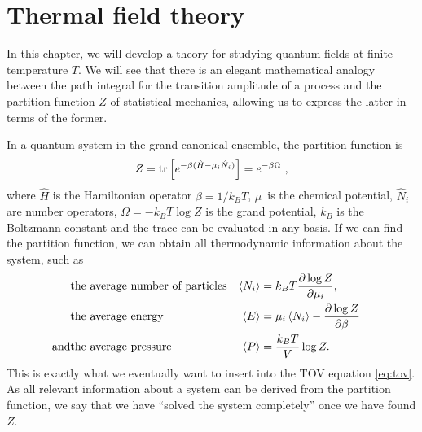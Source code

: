 \chapter{Thermal field theory}

\newcommand{\transampl}{\Braket{\phi_B | e^{- i \hat{H} T / \hbar} | \phi_A}}

In this chapter, we will develop a theory for studying quantum fields at finite temperature $T$.
We will see that there is an elegant mathematical analogy between the path integral for the transition amplitude of a process and the partition function $Z$ of statistical mechanics, allowing us to express the latter in terms of the former.

In a quantum system in the grand canonical ensemble, the partition function is 
\begin{equation}
	Z = \trace \left[ e^{-\beta (\hat{H} - \mu_i \hat{N}_i)} \right] = e^{-\beta \Omega} ,
\label{eq:tft:partition_function}
\end{equation}
where $\hat{H}$ is the Hamiltonian operator $\beta = 1 / k_B T$, $\mu$ is the chemical potential, $\hat{N}_i$ are number operators, $\Omega = -k_B T \log{Z}$ is the grand potential, $k_B$ is the Boltzmann constant and the trace can be evaluated in any basis.
If we can find the partition function, we can obtain all thermodynamic information about the system, such as \cite[chapter 5]{ref:jensoluf}
\begin{align}
	           & \text{the average number of particles} & \thermalavg{N_i} & = k_B T \pdv{\log{Z}}{\mu_i},                    & \label{eq:tft:average_number} \\
	           & \text{the average energy}              & \thermalavg{E}   & = \mu_i \thermalavg{N_i} - \pdv{\log{Z}}{\beta}  & \label{eq:tft:average_energy} \\ %
	\text{and} & \text{the average pressure}            & \thermalavg{P}   & = \frac{k_B T}{V} \log{Z}.                       & \label{eq:tft:average_pressure} %
\end{align}
This is exactly what we eventually want to insert into the TOV equation \eqref{eq:tov}.
As all relevant information about a system can be derived from the partition function, we say that we have ``solved the system completely'' once we have found $Z$.

